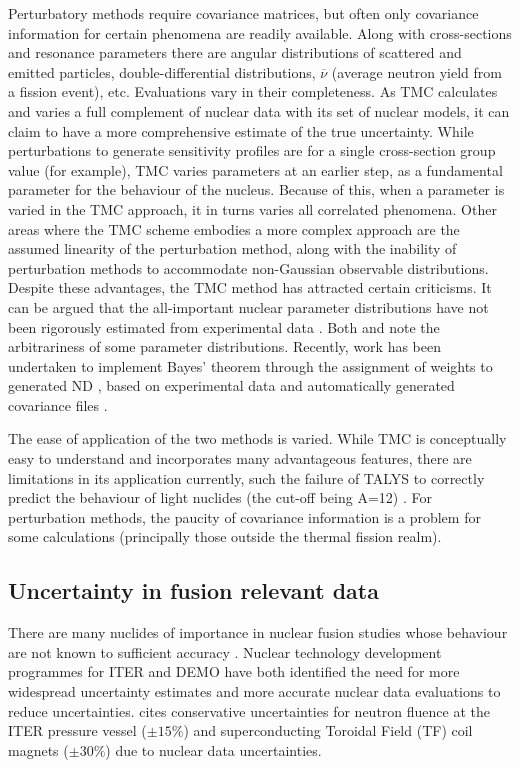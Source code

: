 Perturbatory methods require covariance matrices, but often only covariance information for certain phenomena are readily available. Along with cross-sections and resonance parameters there are angular distributions of scattered and emitted particles, double-differential distributions, $\overline{\nu}$ (average neutron yield from a fission event), etc. Evaluations vary in their completeness. As TMC calculates and varies a full complement of nuclear data with its set of nuclear models, it can claim to have a more comprehensive estimate of the true uncertainty. While perturbations to generate sensitivity profiles are for a single cross-section group value (for example), TMC varies parameters at an earlier step, as a fundamental parameter for the behaviour of the nucleus. Because of this, when a parameter is varied in the TMC approach, it in turns varies all correlated phenomena. Other areas where the TMC scheme embodies a more complex approach are the assumed linearity of the perturbation method, along with the inability of perturbation methods to accommodate non-Gaussian observable distributions. Despite these advantages, the TMC method has attracted certain criticisms. It can be argued that the all-important nuclear parameter distributions have not been rigorously estimated from experimental data \cite{Helgesson2017}. Both \citeauthor{Capote2010} and \citeauthor{Rising2012} note the arbitrariness of some parameter distributions. Recently, work has been undertaken to implement Bayes' theorem through the assignment of weights to generated ND \cite{Koning2015a}, based on experimental data and automatically generated covariance files \cite{Helgesson2017}.


The ease of application of the two methods is varied. While TMC is conceptually easy to understand and incorporates many advantageous features, there are limitations in its application currently, such the failure of TALYS to correctly predict the behaviour of light nuclides (the cut-off being A=12) \cite{Rochman2011}. For perturbation methods, the paucity of covariance information is a problem for some calculations (principally those outside the thermal fission realm). 

\FloatBarrier
\subsection{Uncertainty in fusion relevant data}
There are many nuclides of importance in nuclear fusion studies whose behaviour are not known to sufficient accuracy \cite{Forrest2011}. Nuclear technology development programmes for ITER \cite{Batistoni2008} and DEMO \cite{Abdou2015} have both identified the need for more widespread uncertainty estimates and more accurate nuclear data evaluations to reduce uncertainties. \citeauthor{Batistoni2008} cites conservative uncertainties for neutron fluence at the ITER pressure vessel ($\pm 15\%$) and superconducting Toroidal Field (TF) coil magnets ($\pm 30\%$) due to nuclear data uncertainties. 

